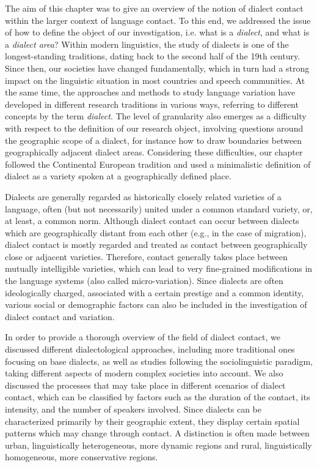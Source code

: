 \documentclass[output=paper]{langscibook}
\begin{document}
The aim of this chapter was to give an overview of the notion of dialect contact within the larger context of language contact. To this end, we addressed the issue of how to define the object of our investigation, i.e. what is a \textit{dialect}, and what is a \textit{dialect area}? Within modern linguistics, the study of dialects is one of the longest-standing traditions, dating back to the second half of the 19th century. Since then, our societies have changed fundamentally, which in turn had a strong impact on the linguistic situation in most countries and speech communities. At the same time, the approaches and methods to study language variation have developed in different research traditions in various ways, referring to different concepts by the term \textit{dialect}. The level of granularity also emerges as a difficulty with respect to the definition of our research object, involving questions around the geographic scope of a dialect, for instance how to draw boundaries between geographically adjacent dialect areas. Considering these difficulties, our chapter followed the Continental European tradition and used a minimalistic definition of dialect as a variety spoken at a geographically defined place. 

Dialects are generally regarded as historically closely related varieties of a language, often (but not necessarily) united under a common standard variety, or, at least, a common norm. Although dialect contact can occur between dialects which are geographically distant from each other (e.g., in the case of migration), dialect contact is mostly regarded and treated as contact between geographically close or adjacent varieties. Therefore, contact generally takes place  between mutually intelligible varieties, which can lead to very fine-grained modifications in the language systems (also called micro-variation). Since dialects are often ideologically charged, associated with a certain prestige and a common identity, various social or demographic factors can also be included in the investigation of dialect contact and variation.

In order to provide a thorough overview of the field of dialect contact, we discussed different dialectological approaches, including more traditional ones focusing on base dialects, as well as studies following the sociolinguistic paradigm, taking different aspects of modern complex societies into account. We also discussed the processes that may take place in different scenarios of dialect contact, which can be classified by factors such as the duration of the contact, its intensity, and the number of speakers involved. Since dialects can be characterized primarily by their geographic extent, they display certain spatial patterns which may change through contact. A distinction is often made between urban, linguistically heterogeneous, more dynamic regions and rural, linguistically homogeneous, more conservative regions.
\end{document}
